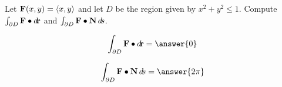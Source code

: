 \documentclass{ximera}
\author{David Guichard \and Neal Koblitz \and H. Jerome Keisler \and Albert Scheller \and Barry Balof \and Mike Wills \and Matthew Carr}
\begin{document}
\begin{exercise}




Let $\mathbf{F}(x,y)=\left\langle x,y\right\rangle$ and let $D$ be the region given by $x^2+y^2\le 1$. Compute $\int_{\partial D}\mathbf{F}\bullet\mathop{}\!d\!\mathbf{r}$ and $\int_{\partial D}\mathbf{F}\bullet\mathbf{N}\mathop{}\!d\! s$.
 
\begin{prompt}
\[
\int_{\partial D}\vec{F}\dotp\d\vec{r}=\answer{0}
\]
\end{prompt}

\begin{prompt}
\[
\int_{\partial D}\vec{F}\dotp\vec{N}\d s=\answer{2\pi }
\]
\end{prompt}



\end{exercise}
\end{document}

